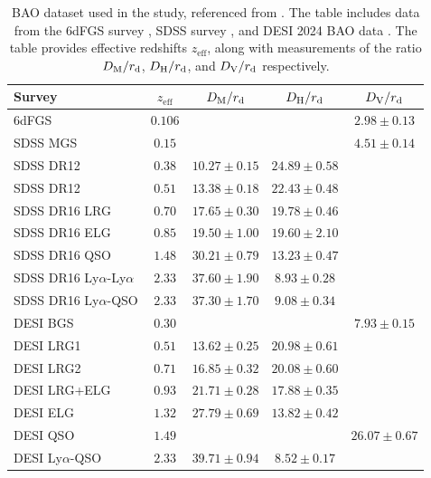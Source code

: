 \documentclass[a4paper,fleqn]{cas-sc}
\begin{document}
\begin{table}
    \begin{center}
    \caption{BAO dataset used in the study, referenced from \cite{luongoDarkEnergyReconstructions2024}. The table includes data from the 6dFGS survey \cite{Beutler_2011}, SDSS survey \cite{PhysRevD.103.083533}, and DESI 2024 BAO data \cite{desicollaboration2024desi2024vicosmological}. The table provides effective redshifts $ z_\text{eff} $, along with measurements of the ratio $ D_{\rm M}/r_{\rm d} $, $ D_{\rm H}/r_{\rm d} $, and $ D_{\rm V}/r_{\rm d} $ respectively.}
    \label{tab:baodata}
    \begin{tabular}{lcccc}
    \toprule
    Survey          & $z_\text{eff}$ & $D_{\rm M}/r_{\rm d}$ & $D_{\rm H}/r_{\rm d}$ & $D_{\rm V}/r_{\rm d}$\\
    \midrule
    6dFGS		    & $0.106$	& & & $2.98\pm0.13$ \\
    \midrule
    SDSS MGS 		& $0.15$	& & & $4.51\pm0.14$ \\
    SDSS DR12		& $0.38$    & $10.27\pm0.15$ & $24.89\pm 0.58$ & \\
    SDSS DR12		& $0.51$    & $13.38\pm0.18$ & $22.43\pm 0.48$ & \\
    SDSS DR16 LRG	& $0.70$    & $17.65\pm0.30$ & $19.78\pm0.46$ & \\
    SDSS DR16 ELG	& $0.85$	& $19.50\pm1.00$ & $19.60\pm2.10$ & \\
    SDSS DR16 QSO	& $1.48$    & $30.21\pm0.79$ & $13.23\pm0.47$ & \\
    SDSS DR16 Ly$\alpha$-Ly$\alpha$& $2.33$     & $37.60\pm1.90$& $8.93\pm0.28$ & \\
    SDSS DR16 Ly$\alpha$-QSO	& $2.33$ & $37.30\pm1.70$& $9.08\pm0.34$ & \\
    \midrule
    DESI BGS 		& $0.30$    & & & $7.93\pm0.15$ \\
    DESI LRG1	 	& $0.51$ 	& $13.62\pm0.25$ & $20.98\pm0.61$ & \\
    DESI LRG2       & $0.71$ 	& $16.85\pm0.32$ & $20.08\pm0.60 $& \\
    DESI LRG+ELG    & $0.93$    & $21.71\pm0.28$ & $17.88\pm0.35$ & \\
    DESI ELG        & $1.32$    & $27.79\pm0.69$ & $13.82\pm0.42$ & \\
    DESI QSO		& $1.49$	& & & $26.07\pm0.67$ \\
    DESI Ly$\alpha$-QSO & $2.33$ 	& $39.71\pm0.94$ & $8.52\pm0.17$ & \\
    \bottomrule
    \end{tabular}
    \end{center}
\end{table}
\end{document}
